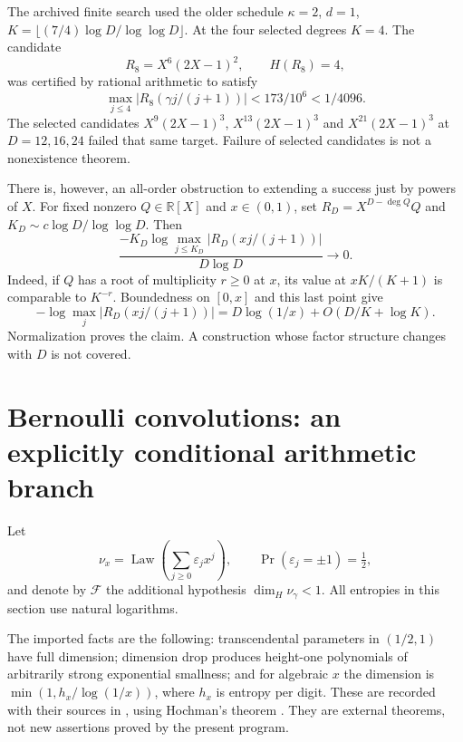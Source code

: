 \documentclass[11pt,a4paper]{article}
\newcommand{\R}{\mathbb R}
\theoremstyle{definition}
\theoremstyle{remark}
\numberwithin{equation}{section}
\begin{document}
The archived finite search used the older schedule $\kappa=2$, $d=1$, $K=\lfloor(7/4)\log D/\log\log D\rfloor$. At the four selected degrees $K=4$. The candidate
\[
 R_8=X^6(2X-1)^2,\qquad H(R_8)=4,
\]
was certified by rational arithmetic to satisfy
\[
 \max_{j\le4}|R_8(\gamma j/(j+1))|<173/10^6<1/4096.
\]
The selected candidates $X^9(2X-1)^3$, $X^{13}(2X-1)^3$ and $X^{21}(2X-1)^3$ at $D=12,16,24$ failed that same target. Failure of selected candidates is not a nonexistence theorem.

There is, however, an all-order obstruction to extending a success just by powers of $X$. For fixed nonzero $Q\in\R[X]$ and $x\in(0,1)$, set $R_D=X^{D-\deg Q}Q$ and $K_D\sim c\log D/\log\log D$. Then
\[
 \frac{-K_D\log\max_{j\le K_D}|R_D(xj/(j+1))|}{D\log D}\longrightarrow0.
\]
Indeed, if $Q$ has a root of multiplicity $r\ge0$ at $x$, its value at $xK/(K+1)$ is comparable to $K^{-r}$. Boundedness on $[0,x]$ and this last point give
\[
 -\log\max_j|R_D(xj/(j+1))|
 =D\log(1/x)+O(D/K+\log K).
\]
Normalization proves the claim. A construction whose factor structure changes with $D$ is not covered.

\section{Bernoulli convolutions: an explicitly conditional arithmetic branch}
\label{inf:sec:fractal}
Let
\[
 \nu_x=\operatorname{Law}\left(\sum_{j\ge0}\varepsilon_jx^j\right),
 \qquad\Pr(\varepsilon_j=\pm1)=\tfrac12,
\]
and denote by $\mathcal F$ the additional hypothesis $\dim_H\nu_\gamma<1$. All entropies in this section use natural logarithms.

The imported facts are the following: transcendental parameters in $(1/2,1)$ have full dimension; dimension drop produces height-one polynomials of arbitrarily strong exponential smallness; and for algebraic $x$ the dimension is $\min(1,h_x/\log(1/x))$, where $h_x$ is entropy per digit. These are recorded with their sources in \cite[Theorems 3, 6, 8]{inf:Varju}, using Hochman's theorem \cite{inf:Hochman}. They are external theorems, not new assertions proved by the present program.
\end{document}
